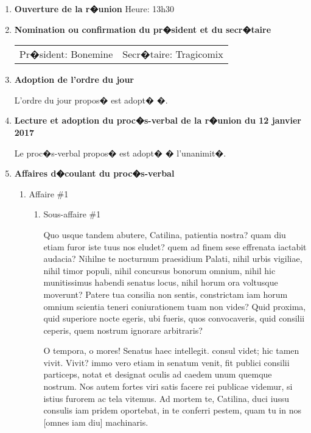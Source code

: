 \documentclass[12pt]{ULojpv}
\begin{document}
\entete
\begin{enumerate}

\item \textbf{Ouverture de la r�union}
Heure: 13h30

\item \textbf{Nomination ou confirmation du pr�sident et du secr�taire}

\begin{tabular}{@{}ll}
   Pr�sident: Bonemine
   & Secr�taire: Tragicomix
\end{tabular}

\item \textbf{Adoption de l'ordre du jour}

L'ordre du jour propos� est adopt� �.

\item \textbf{Lecture et adoption du proc�s-verbal de la r�union du 12 janvier 2017}

Le proc�s-verbal propos� est adopt� � l'unanimit�.

\item \textbf{Affaires d�coulant du proc�s-verbal}

\begin{enumerate}

\item Affaire \#1

\begin{enumerate}

\item Sous-affaire \#1

Quo usque tandem abutere, Catilina, patientia nostra? quam diu etiam furor iste tuus nos eludet? quem ad finem sese effrenata iactabit audacia? Nihilne te nocturnum praesidium Palati, nihil urbis vigiliae, nihil timor populi, nihil concursus bonorum omnium, nihil hic munitissimus habendi senatus locus, nihil horum ora voltusque moverunt? Patere tua consilia non sentis, constrictam iam horum omnium scientia teneri coniurationem tuam non vides? Quid proxima, quid superiore nocte egeris, ubi fueris, quos convocaveris, quid consilii ceperis, quem nostrum ignorare arbitraris?

O tempora, o mores! Senatus haec intellegit. consul videt; hic tamen vivit. Vivit? immo vero etiam in senatum venit, fit publici consilii particeps, notat et designat oculis ad caedem unum quemque nostrum. Nos autem fortes viri satis facere rei publicae videmur, si istius furorem ac tela vitemus. Ad mortem te, Catilina, duci iussu consulis iam pridem oportebat, in te conferri pestem, quam tu in nos [omnes iam diu] machinaris.



\end{enumerate}
\end{enumerate}
\end{enumerate}
\end{document}
